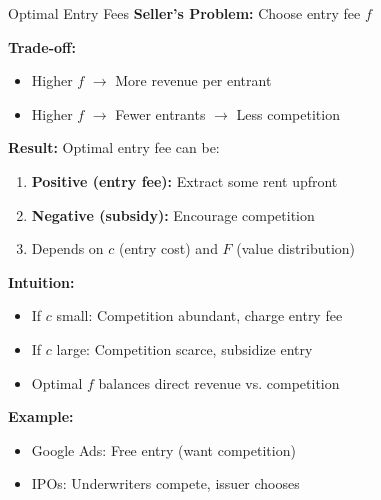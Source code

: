 \documentclass[xcolor={x11names}, aspectratio=169 ]{beamer}
\begin{document}
\begin{frame}{Optimal Entry Fees}
\textbf{Seller's Problem:} Choose entry fee $f$

\textbf{Trade-off:}
\begin{itemize}
  \item Higher $f$ $\rightarrow$ More revenue per entrant
  \item Higher $f$ $\rightarrow$ Fewer entrants $\rightarrow$ Less competition
\end{itemize}

\textbf{Result:}
Optimal entry fee can be:
\begin{enumerate}
  \item \textbf{Positive (entry fee):} Extract some rent upfront
  \item \textbf{Negative (subsidy):} Encourage competition
  \item Depends on $c$ (entry cost) and $F$ (value distribution)
\end{enumerate}

\textbf{Intuition:}
\begin{itemize}
  \item If $c$ small: Competition abundant, charge entry fee
  \item If $c$ large: Competition scarce, subsidize entry
  \item Optimal $f$ balances direct revenue vs. competition
\end{itemize}

\textbf{Example:}
\begin{itemize}
  \item Google Ads: Free entry (want competition)
  \item IPOs: Underwriters compete, issuer chooses
\end{itemize}
\end{frame}
\end{document}
